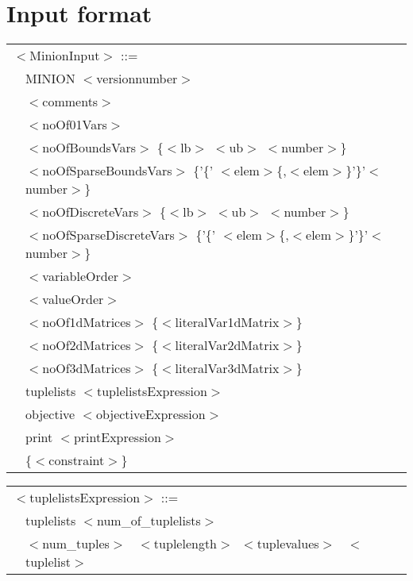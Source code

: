 \documentclass{article}
\begin{document}
\begin{small}
\begin{description}
\end{description}



\clearpage
\section{Input format}\label{sect_input}


\noindent
\setlength{\tabcolsep}{0mm}
\begin{tabular}{ll}
\multicolumn{2}{l}{$<$MinionInput$>$ ::=} \\
\hspace*{2mm} &MINION $<$versionnumber$>$ \\
              &$<$comments$>$\\
              &$<$noOf01Vars$>$\\
              &$<$noOfBoundsVars$>$ \{$<$lb$>$ $<$ub$>$ $<$number$>$\}\\
              &$<$noOfSparseBoundsVars$>$ \{'\{' $<$elem$>$\{,$<$elem$>$\}'\}'$<$number$>$\}\\
              &$<$noOfDiscreteVars$>$ \{$<$lb$>$ $<$ub$>$ $<$number$>$\}\\
              &$<$noOfSparseDiscreteVars$>$ \{'\{' $<$elem$>$\{,$<$elem$>$\}'\}'$<$number$>$\}\\
              &$<$variableOrder$>$\\
              &$<$valueOrder$>$\\
              &$<$noOf1dMatrices$>$ \{$<$literalVar1dMatrix$>$\}\\
              &$<$noOf2dMatrices$>$ \{$<$literalVar2dMatrix$>$\}\\
              &$<$noOf3dMatrices$>$ \{$<$literalVar3dMatrix$>$\}\\
              &tuplelists $<$tuplelistsExpression$>$ \\
              &objective $<$objectiveExpression$>$\\
              &print $<$printExpression$>$\\
              &\{$<$constraint$>$\}
\end{tabular}
\vspace*{1mm}

\noindent
\setlength{\tabcolsep}{0mm}
\begin{tabular}{ll}
\multicolumn{2}{l}{$<$tuplelistsExpression$>$ ::=}\\
\hspace*{2mm} &   tuplelists $<$num\_of\_tuplelists$>$   \\
\hspace*{2mm} &   $<$num\_tuples$>$ \ $<$tuplelength$>$\  $<$tuplevalues$> $ \ $<$tuplelist$>$ \\
\end{tabular}
\vspace*{1mm}


\end{small}
\end{document}
